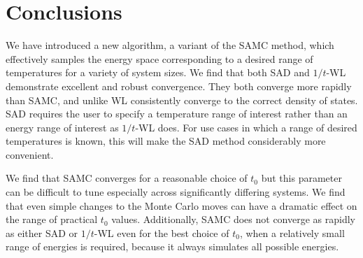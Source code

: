 \documentclass[letterpaper,twocolumn,amsmath,amssymb,pre,aps,10pt]{revtex4-1}
\begin{document}

\section{Conclusions}
We have introduced a new algorithm, a variant of the SAMC method, which
effectively samples the
energy space corresponding to a desired range of temperatures for a
variety of system sizes.
%
We find that both SAD and $1/t$-WL demonstrate excellent and robust
convergence.
They both converge more rapidly than SAMC, and unlike WL consistently
converge to the correct density of states. SAD requires
the user to specify a temperature range of interest rather than an
energy range of interest as $1/t$-WL does.  For use cases in which
a range of desired temperatures is known, this will make the SAD method
considerably more convenient.

We find that SAMC converges for a reasonable choice of
$t_0$ but this parameter can be difficult to tune especially across
significantly differing systems.  We find that even simple
changes to the Monte Carlo moves can have a dramatic effect on the
range of practical $t_0$ values.  Additionally, SAMC does not
converge as rapidly as either SAD or $1/t$-WL even for the best choice of $t_0$,
when a relatively small range of energies is required, because it always
simulates all possible energies.




\end{document}

